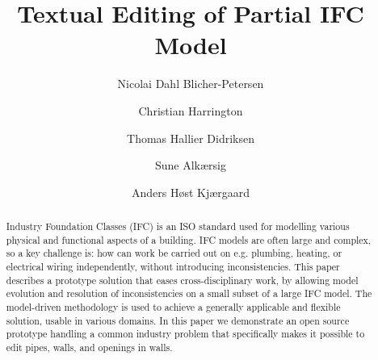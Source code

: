 \documentclass[oribibl]{llncs}
\begin{document}

\mainmatter              %
\title{Textual Editing of Partial IFC Model}

\author{Nicolai Dahl Blicher-Petersen \and Christian Harrington \and
Thomas Hallier Didriksen \and Sune Alkærsig \and Anders Høst Kjærgaard\\
}



\maketitle              %

\begin{abstract}
Industry Foundation Classes (IFC) is an ISO standard used for modelling various physical and functional aspects of a building. IFC models are often large and complex, so a key challenge is: how can work be carried out on e.g. plumbing, heating, or electrical wiring independently, without introducing inconsistencies. This paper describes a prototype solution that eases cross-disciplinary work, by allowing model evolution and resolution of inconsistencies on a small subset of a large IFC model. The model-driven methodology is used to achieve a generally applicable and flexible solution, usable in various domains. In this paper we demonstrate an open source prototype handling a common industry problem that specifically makes it possible to edit pipes, walls, and openings in walls.

\end{abstract}











\end{document}
